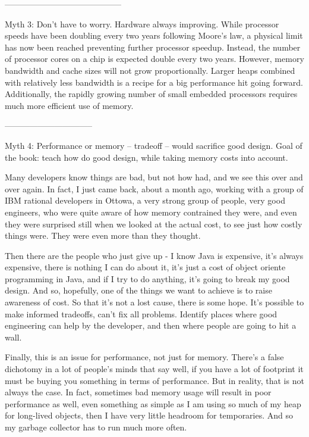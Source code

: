 ------------------------------------------ 

Myth 3:  Don't have to worry. Hardware always improving.
While processor speeds have been doubling every two years following Moore's law, a physical limit has now been reached preventing further processor speedup. Instead, the number of processor cores on a chip is expected double every two years. However, memory bandwidth and cache sizes will not grow proportionally. Larger heaps combined with relatively less bandwidth is a recipe for a big performance hit going forward. Additionally, the rapidly growing number of small embedded processors requires much more efficient use of memory.


--------------------------------

Myth 4: Performance or memory -- tradeoff -- would sacrifice good design.
Goal of the book:  teach how do good design, while taking memory costs into account.

Many developers know things are bad, but not how had, and we see this over and over again. In fact, I just came back, about a month ago, working with a group of IBM rational developers in Ottowa, a very strong group of people, very good engineers, who were quite aware of how memory contrained they were, and even they were surprised still when we looked at the actual cost, to see just how costly things were. They were even more than they thought.

Then there are the people who just give up - I know Java is expensive, it's always expensive, there is nothing I can do about it, it's just a cost of object oriente programming in Java, and if I try to do anything, it's going to break my good design.
And so, hopefully, one of the things we want to achieve is to raise awareness of cost. So that it's not a lost cause, there is some hope.  It's possible to make informed tradeoffs, can't fix all problems. Identify places where good engineering can help by the developer, and then where people are going to hit a wall.

Finally, this is an issue for performance, not just for memory. There's a false dichotomy in a lot of people's minds that say well, if you have a lot of footprint it must be buying you something in terms of performance. But in reality, that is not always the case. In fact, sometimes bad memory usage will result in poor performance as well, even something as simple as I am using so much of my heap for long-lived objects, then I have very little headroom for temporaries.  And so my garbage collector has to run much more often. 


